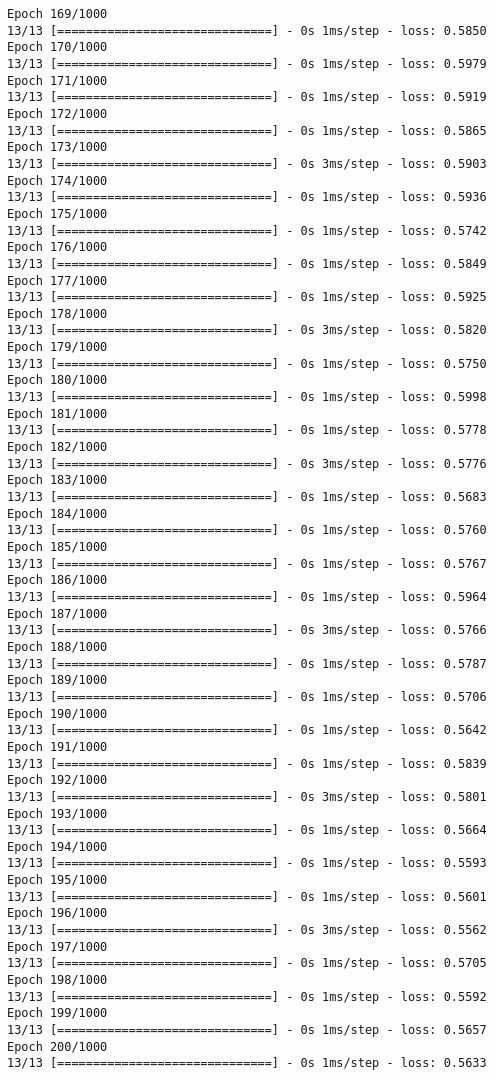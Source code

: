 \documentclass[11pt]{article}
\begin{document}
\begin{Verbatim}[commandchars=\\\{\}]
Epoch 169/1000
13/13 [==============================] - 0s 1ms/step - loss: 0.5850
Epoch 170/1000
13/13 [==============================] - 0s 1ms/step - loss: 0.5979
Epoch 171/1000
13/13 [==============================] - 0s 1ms/step - loss: 0.5919
Epoch 172/1000
13/13 [==============================] - 0s 1ms/step - loss: 0.5865
Epoch 173/1000
13/13 [==============================] - 0s 3ms/step - loss: 0.5903
Epoch 174/1000
13/13 [==============================] - 0s 1ms/step - loss: 0.5936
Epoch 175/1000
13/13 [==============================] - 0s 1ms/step - loss: 0.5742
Epoch 176/1000
13/13 [==============================] - 0s 1ms/step - loss: 0.5849
Epoch 177/1000
13/13 [==============================] - 0s 1ms/step - loss: 0.5925
Epoch 178/1000
13/13 [==============================] - 0s 3ms/step - loss: 0.5820
Epoch 179/1000
13/13 [==============================] - 0s 1ms/step - loss: 0.5750
Epoch 180/1000
13/13 [==============================] - 0s 1ms/step - loss: 0.5998
Epoch 181/1000
13/13 [==============================] - 0s 1ms/step - loss: 0.5778
Epoch 182/1000
13/13 [==============================] - 0s 3ms/step - loss: 0.5776
Epoch 183/1000
13/13 [==============================] - 0s 1ms/step - loss: 0.5683
Epoch 184/1000
13/13 [==============================] - 0s 1ms/step - loss: 0.5760
Epoch 185/1000
13/13 [==============================] - 0s 1ms/step - loss: 0.5767
Epoch 186/1000
13/13 [==============================] - 0s 1ms/step - loss: 0.5964
Epoch 187/1000
13/13 [==============================] - 0s 3ms/step - loss: 0.5766
Epoch 188/1000
13/13 [==============================] - 0s 1ms/step - loss: 0.5787
Epoch 189/1000
13/13 [==============================] - 0s 1ms/step - loss: 0.5706
Epoch 190/1000
13/13 [==============================] - 0s 1ms/step - loss: 0.5642
Epoch 191/1000
13/13 [==============================] - 0s 1ms/step - loss: 0.5839
Epoch 192/1000
13/13 [==============================] - 0s 3ms/step - loss: 0.5801
Epoch 193/1000
13/13 [==============================] - 0s 1ms/step - loss: 0.5664
Epoch 194/1000
13/13 [==============================] - 0s 1ms/step - loss: 0.5593
Epoch 195/1000
13/13 [==============================] - 0s 1ms/step - loss: 0.5601
Epoch 196/1000
13/13 [==============================] - 0s 3ms/step - loss: 0.5562
Epoch 197/1000
13/13 [==============================] - 0s 1ms/step - loss: 0.5705
Epoch 198/1000
13/13 [==============================] - 0s 1ms/step - loss: 0.5592
Epoch 199/1000
13/13 [==============================] - 0s 1ms/step - loss: 0.5657
Epoch 200/1000
13/13 [==============================] - 0s 1ms/step - loss: 0.5633

\end{Verbatim}
\end{document}
